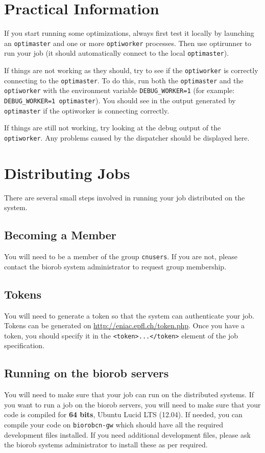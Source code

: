 \documentclass{report}
\begin{document}
\section{Practical Information}
If you start running some optimizations, always first test it locally by
launching an \verb!optimaster! and one or more \verb!optiworker! processes.
Then use optirunner to run your job (it should automatically connect to the
local \verb!optimaster!).

If things are not working as they should, try to see if the \verb!optiworker!
is correctly connecting to the \verb!optimaster!. To do this, run both the
\verb!optimaster! and the \verb!optiworker! with the environment variable
\verb!DEBUG_WORKER=1! (for example: \verb!DEBUG_WORKER=1 optimaster!). You
should see in the output generated by \verb!optimaster! if the optiworker is
connecting correctly.

If things are still not working, try looking at the debug output of the
\verb!optiworker!. Any problems caused by the dispatcher should be displayed
here.

\section{Distributing Jobs}
There are several small steps involved in running your job distributed on the
system.

\subsection{Becoming a Member}
You will need to be a member of the group \verb!cnusers!. If you
are not, please contact the biorob system administrator to request group
membership.

\subsection{Tokens}\label{sec:tokens}
You will need to generate a token so that the system can authenticate
your job. Tokens can be generated on \url{http://eniac.epfl.ch/token.php}. Once
you have a token, you should specify it in the \verb!<token>...</token>! element
of the job specification.

\subsection{Running on the biorob servers}
You will need to make sure that your job can run on the distributed
systems. If you want to run a job on the biorob servers, you will need to make
sure that your code is compiled for \textbf{64 bits}, Ubuntu Lucid LTS (12.04).
If needed, you can compile your code on \verb!biorobcn-gw! which should have all
the required development files installed. If you need additional development
files, please ask the biorob systems administrator to install these as per required.
\end{document}
